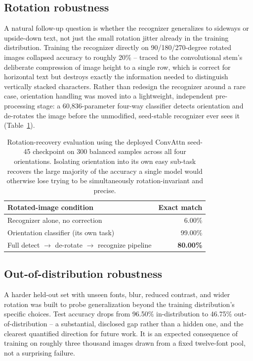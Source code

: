 \documentclass[10pt]{article}
\begin{document}
\subsection{Rotation robustness}

A natural follow-up question is whether the recognizer generalizes to sideways or
upside-down text, not just the small rotation jitter already in the training
distribution. Training the recognizer directly on 90/180/270-degree rotated images
collapsed accuracy to roughly 20\% -- traced to the convolutional stem's deliberate
compression of image height to a single row, which is correct for horizontal text but
destroys exactly the information needed to distinguish vertically stacked characters.
Rather than redesign the recognizer around a rare case, orientation handling was moved
into a lightweight, independent pre-processing stage: a 60,836-parameter four-way
classifier detects orientation and de-rotates the image before the unmodified,
seed-stable recognizer ever sees it (Table~\ref{tab:rotation}).

\begin{table}[H]
\centering
\begin{tabular}{@{}lr@{}}
\toprule
\textbf{Rotated-image condition} & \textbf{Exact match} \\
\midrule
Recognizer alone, no correction & 6.00\% \\
Orientation classifier (its own task) & 99.00\% \\
Full detect $\to$ de-rotate $\to$ recognize pipeline & \textbf{80.00\%} \\
\bottomrule
\end{tabular}
\caption{Rotation-recovery evaluation using the deployed ConvAttn seed-45 checkpoint
on 300 balanced samples across all four
orientations. Isolating orientation into its own easy sub-task recovers the large
majority of the accuracy a single model would otherwise lose trying to be
simultaneously rotation-invariant and precise.}
\label{tab:rotation}
\end{table}

\subsection{Out-of-distribution robustness}

A harder held-out set with unseen fonts, blur, reduced contrast, and wider rotation was
built to probe generalization beyond the training distribution's specific choices. Test
accuracy drops from 96.50\% in-distribution to 46.75\% out-of-distribution -- a
substantial, disclosed gap rather than a hidden one, and the clearest quantified
direction for future work. It is an expected consequence of training on roughly three
thousand images drawn from a fixed twelve-font pool, not a surprising failure.
\end{document}
